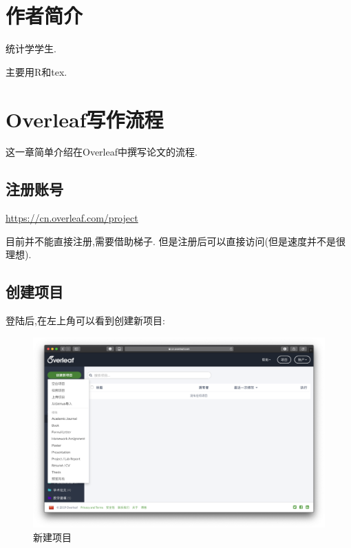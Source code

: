 \documentclass[]{ctexbook}
\begin{document}
\hypertarget{author}{%
\chapter*{作者简介}\label{author}}


统计学学生.

主要用R和tex.

\mainmatter

\hypertarget{intro}{%
\chapter{Overleaf写作流程}\label{intro}}

这一章简单介绍在Overleaf中撰写论文的流程.

\hypertarget{section-2}{%
\section{注册账号}\label{section-2}}

\url{https://cn.overleaf.com/project}

目前并不能直接注册,需要借助梯子.
但是注册后可以直接访问(但是速度并不是很理想).

\hypertarget{section-3}{%
\section{创建项目}\label{section-3}}

登陆后,在左上角可以看到创建新项目:

\begin{figure}
\centering
\includegraphics{figure/newproject.png}
\caption{新建项目}
\end{figure}
\end{document}
